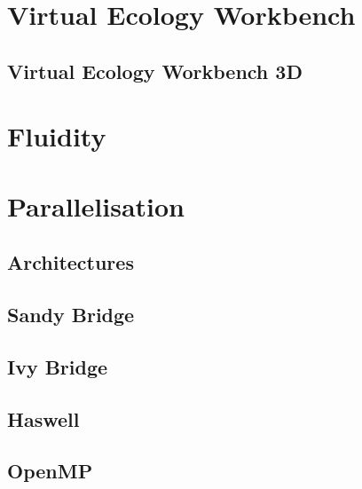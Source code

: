 \documentclass[10pt, a4paper]{report}
\begin{document}
\section{Virtual Ecology Workbench}\label{sec:vew}

\subsection{Virtual Ecology Workbench 3D}\label{subsec:vew3d}

\section{Fluidity}\label{sec:fluidity}

\section{Parallelisation}\label{sec:parallel}

\subsection{Architectures}\label{subsec:}

\subsection{Sandy Bridge}\label{subsec:potoo}

\subsection{Ivy Bridge}\label{subsec:lab}

\subsection{Haswell}\label{subsec:notebook}

\subsection{OpenMP}\label{subsec:openmp}

\end{document}
